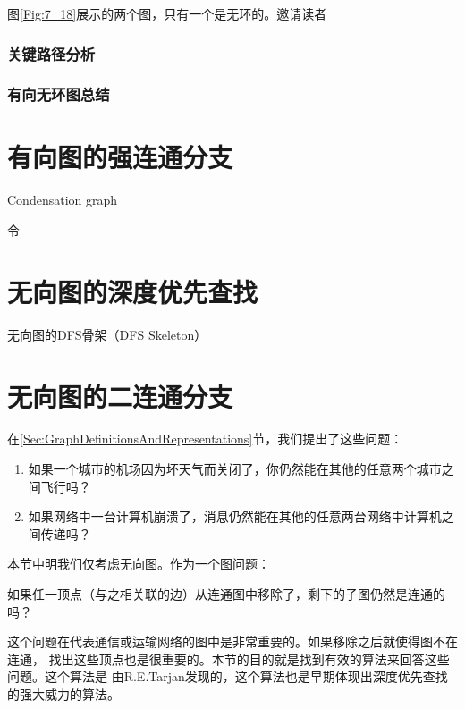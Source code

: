 图\ref{Fig:7_18}展示的两个图，只有一个是无环的。邀请读者

\subsubsection{关键路径分析}

\subsubsection{有向无环图总结}

\section{有向图的强连通分支}\label{Sec:7_5StronglyConnectedComponentsofDirgraph}
\begin{definition}\label{Def:CondensationGraph}
Condensation graph

令
\end{definition}

\section{无向图的深度优先查找}\label{Sec:DFSonUndirectedGraph}
\begin{algorithm}\label{Algo:SkeletonUndirectGraphDFS}
无向图的DFS骨架（DFS Skeleton）
\end{algorithm}

\section{无向图的二连通分支}\label{Sec:7_7BiConnectedComponentsofUndirgraph}
在\ref{Sec:GraphDefinitionsAndRepresentations}节，我们提出了这些问题：
\begin{enumerate}
\item 如果一个城市的机场因为坏天气而关闭了，你仍然能在其他的任意两个城市之间飞行吗？
\item 如果网络中一台计算机崩溃了，消息仍然能在其他的任意两台网络中计算机之间传递吗？
\end{enumerate}
本节中明我们仅考虑无向图。作为一个图问题：

\begin{problem}\vspace{1ex}
如果任一顶点（与之相关联的边）从连通图中移除了，剩下的子图仍然是连通的吗？
\end{problem}
这个问题在代表通信或运输网络的图中是非常重要的。如果移除之后就使得图不在连通，
找出这些顶点也是很重要的。本节的目的就是找到有效的算法来回答这些问题。这个算法是
由R.E.Tarjan发现的，这个算法也是早期体现出深度优先查找的强大威力的算法。

